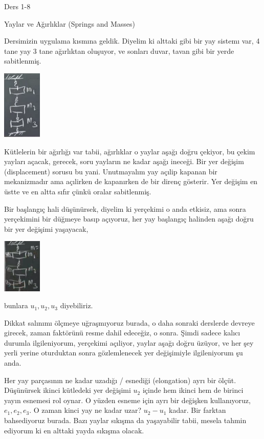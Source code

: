 \documentclass[12pt,fleqn]{article}\usepackage{../../common}
\begin{document}
Ders 1-8

Yaylar ve Ağırlıklar (Springs and Masses)

Dersimizin uygulama kısmına geldik. Diyelim ki alttaki gibi bir yay sistemı var,
4 tane yay 3 tane ağırlıktan oluşuyor, ve sonları duvar, tavan gibi bir yerde
sabitlenmiş.

\includegraphics[width=5em]{compscieng_1_08_01.png}

Kütlelerin bir ağırlığı var tabii, ağırlıklar o yaylar aşağı doğru çekiyor, bu
çekim yayları açacak, gerecek, soru yayların ne kadar aşağı ineceği.  Bir yer
değişim (displacement) sorusu bu yani. Unutmayalım yay açılip kapanan bir
mekanizmadır ama açılirken de kapanırken de bir direnç gösterir. Yer değişim en
üstte ve en altta sıfır çünkü oralar sabitlenmiş.

Bir başlangıç hali düşünürsek, diyelim ki yerçekimi o anda etkisiz, ama sonra
yerçekimini bir düğmeye basıp açıyoruz, her yay başlangıç halinden aşağı
doğru bir yer değişimi yaşayacak, 

\includegraphics[width=5em]{compscieng_1_08_02.png}

bunlara $u_1,u_2,u_3$ diyebiliriz.

Dikkat salınımı ölçmeye uğraşmıyoruz burada, o daha sonraki derslerde devreye
girecek, zaman faktörünü resme dahil edeceğiz, o sonra. Şimdi sadece kalıcı
durumla ilgileniyorum, yerçekimi açıliyor, yaylar aşağı doğru üzüyor, ve her şey
yerli yerine oturduktan sonra gözlemlenecek yer değişimiyle ilgileniyorum şu
anda.

Her yay parçasının ne kadar uzadığı / esnediği (elongation) ayrı bir ölçüt.
Düşünürsek ikinci kütledeki yer değişimi $u_2$ içinde hem ikinci hem de birinci
yayın esnemesi rol oynar. O yüzden esneme için ayrı bir değişken kullanıyoruz,
$e_1,e_2,e_3$. O zaman kinci yay ne kadar uzar? $u_2-u_1$ kadar. Bir farktan
bahsediyoruz burada. Bazı yaylar sıkışma da yaşayabilir tabii, mesela tahmin
ediyorum ki en alttaki yayda sıkışma olacak.
\end{document}
